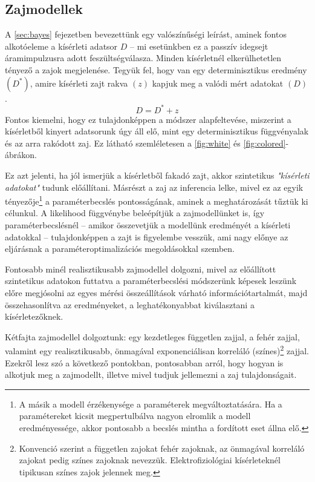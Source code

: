 \subsection{Zajmodellek}\label{sec:noise}
A \ref{sec:bayes} fejezetben bevezettünk egy valószínűségi leírást, aminek fontos alkotóeleme a kísérleti adatsor $D$ -- mi esetünkben ez a passzív idegsejt áramimpulzusra adott feszültségválasza. Minden kísérletnél elkerülhetetlen tényező a zajok megjelenése. Tegyük fel, hogy van egy determinisztikus eredmény $(D^*)$, amire kísérleti zajt rakva $(z)$ kapjuk meg a valódi mért adatokat $(D)$. 
\[
D = D^* + z
\]
Fontos kiemelni, hogy ez tulajdonképpen a módszer alapfeltevése, miszerint a kísérletből kinyert adatsorunk úgy áll elő, mint egy determinisztikus függvényalak és az  arra rakódott zaj. Ez látható szemléletesen a \ref{fig:white} és \ref{fig:colored}-ábrákon.

Ez azt jelenti, ha jól ismerjük a kísérletből fakadó zajt, akkor szintetikus \textit{"kísérleti adatokat"} tudunk előállítani. Másrészt a zaj az inferencia lelke, mivel ez az egyik tényezője\footnote{A másik a modell érzékenysége a paraméterek megváltoztatására. Ha a paramétereket kicsit megpertulbálva nagyon elromlik a modell eredményessége, akkor pontosabb a becslés mintha a fordított eset állna elő.} a paraméterbecslés pontosságának, aminek a meghatározását tűztük ki célunkul. A likelihood függvénybe beleépítjük a zajmodellünket is, így paraméterbecslésnél -- amikor összevetjük a modellünk eredményét a kísérleti adatokkal -- tulajdonképpen a zajt is figyelembe vesszük, ami nagy előnye az eljárásnak a paraméteroptimalizációs megoldásokkal szemben.

Fontosabb minél realisztikusabb zajmodellel dolgozni, mivel az előállított szintetikus adatokon futtatva a paraméterbecslési módszerünk képesek leszünk előre megjósolni az egyes mérési összeállítások várható információtartalmát, majd összehasonlítva az eredményeket, a leghatékonyabbat kiválasztani a kísérletezőknek.

Kétfajta zajmodellel dolgoztunk: egy kezdetleges független zajjal, a fehér zajjal, valamint egy realisztikusabb, önmagával exponenciálisan korreláló (színes)\footnote{Konvenció szerint a független zajokat fehér zajoknak, az önmagával korreláló zajokat pedig színes zajoknak nevezzük. Elektrofiziológiai kísérleteknél tipikusan színes zajok jelennek meg.} zajjal. Ezekről lesz szó a következő pontokban, pontosabban arról, hogy hogyan is alkotjuk meg a zajmodellt, illetve mivel tudjuk jellemezni a zaj tulajdonságait.

